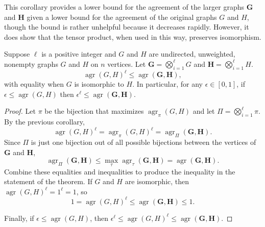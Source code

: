 \documentclass{article}
\newcommand{\1}{\mathbf{1}}
\DeclareMathOperator{\agr}{agr}
\begin{document}
This corollary provides a lower bound for the agreement of the larger graphs $\mathbf{G}$ and $\mathbf{H}$ given a lower bound for the agreement of the original graphs $G$ and $H$, though the bound is rather unhelpful because it decreases rapidly.
However, it does show that the tensor product, when used in this way, preserves isomorphism.


\begin{theorem}
  Suppose $\ell$ is a positive integer and $G$ and $H$ are undirected, unweighted, nonempty graphs $G$ and $H$ on $n$ vertices.
  Let $\mathbf{G} = \bigotimes_{i = 1}^\ell G$ and $\mathbf{H} = \bigotimes_{i = 1}^\ell H$.
  \begin{equation*}
    \agr(G, H)^\ell \leq \agr(\mathbf{G}, \mathbf{H}),
  \end{equation*}
  with equality when $G$ is isomorphic to $H$.
  In particular, for any $\epsilon \in [0, 1]$, if $\epsilon \leq \agr(G, H)$ then $\epsilon^\ell \leq \agr(\mathbf{G}, \mathbf{H})$.
\end{theorem}
\begin{proof}
  Let $\pi$ be the bijection that maximizes $\agr_\pi(G, H)$ and let $\Pi = \bigotimes_{i = 1}^\ell \pi$.
  By the previous corollary,
  \begin{equation*}
    \agr(G, H)^\ell = \agr_\pi(G, H)^\ell = \agr_\Pi(\mathbf{G}, \mathbf{H}).
  \end{equation*}
  Since $\Pi$ is just one bijection out of all possible bijections between the vertices of $\mathbf{G}$ and $\mathbf{H}$,
  \begin{equation*}
    \agr_\Pi(\mathbf{G}, \mathbf{H}) \leq \max_\tau \agr_\tau(\mathbf{G}, \mathbf{H}) = \agr(\mathbf{G}, \mathbf{H}).
  \end{equation*}
  Combine these equalities and inequalities to produce the inequality in the statement of the theorem.
  If $G$ and $H$ are isomorphic, then $\agr(G, H)^\ell = 1^\ell = 1$, so
  \begin{equation*}
    1 = \agr(G, H)^\ell \leq \agr(\mathbf{G}, \mathbf{H}) \leq 1.
  \end{equation*}

  Finally, if $\epsilon \leq \agr(G, H)$, then $\epsilon^\ell \leq \agr(G, H)^\ell \leq \agr(\mathbf{G}, \mathbf{H})$.
\end{proof}
\end{document}
